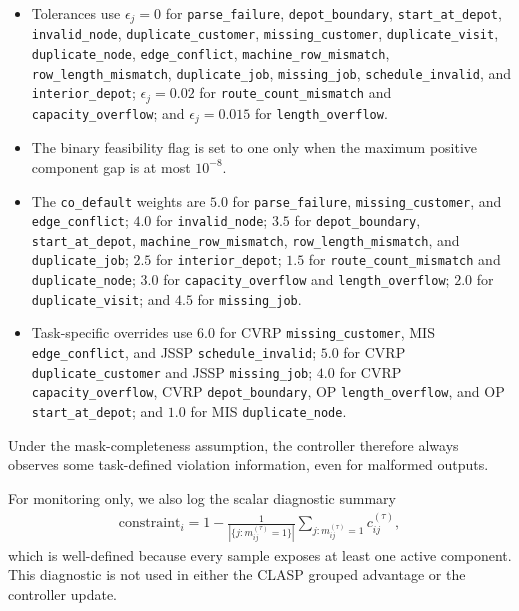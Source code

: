 \documentclass{article}
\theoremstyle{remark}
\begin{document}
\begin{sloppypar}
\begin{itemize}
\item Tolerances use \(\epsilon_j=0\) for \texttt{parse\_failure}, \texttt{depot\_boundary}, \texttt{start\_at\_depot}, \texttt{invalid\_node}, \texttt{duplicate\_customer}, \texttt{missing\_customer}, \texttt{duplicate\_visit}, \texttt{duplicate\_node}, \texttt{edge\_conflict}, \texttt{machine\_row\_mismatch}, \texttt{row\_length\_mismatch}, \texttt{duplicate\_job}, \texttt{missing\_job}, \texttt{schedule\_invalid}, and \texttt{interior\_depot}; \(\epsilon_j=0.02\) for \texttt{route\_count\_mismatch} and \texttt{capacity\_overflow}; and \(\epsilon_j=0.015\) for \texttt{length\_overflow}.
\item The binary feasibility flag is set to one only when the maximum positive component gap is at most \(10^{-8}\).
\item The \texttt{co\_default} weights are \(5.0\) for \texttt{parse\_failure}, \texttt{missing\_customer}, and \texttt{edge\_conflict}; \(4.0\) for \texttt{invalid\_node}; \(3.5\) for \texttt{depot\_boundary}, \texttt{start\_at\_depot}, \texttt{machine\_row\_mismatch}, \texttt{row\_length\_mismatch}, and \texttt{duplicate\_job}; \(2.5\) for \texttt{interior\_depot}; \(1.5\) for \texttt{route\_count\_mismatch} and \texttt{duplicate\_node}; \(3.0\) for \texttt{capacity\_overflow} and \texttt{length\_overflow}; \(2.0\) for \texttt{duplicate\_visit}; and \(4.5\) for \texttt{missing\_job}.
\item Task-specific overrides use \(6.0\) for CVRP \texttt{missing\_customer}, MIS \texttt{edge\_conflict}, and JSSP \texttt{schedule\_invalid}; \(5.0\) for CVRP \texttt{duplicate\_customer} and JSSP \texttt{missing\_job}; \(4.0\) for CVRP \texttt{capacity\_overflow}, CVRP \texttt{depot\_boundary}, OP \texttt{length\_overflow}, and OP \texttt{start\_at\_depot}; and \(1.0\) for MIS \texttt{duplicate\_node}.
\end{itemize}
\end{sloppypar}
Under the mask-completeness assumption, the controller therefore always observes some task-defined violation information, even for malformed outputs.

For monitoring only, we also log the scalar diagnostic summary
\begin{align}
\mathrm{constraint}_i = 1 - \frac{1}{|\{j:m_{ij}^{(\tau)}=1\}|}\sum_{j:m_{ij}^{(\tau)}=1} c_{ij}^{(\tau)},
\end{align}
which is well-defined because every sample exposes at least one active component. This diagnostic is not used in either the CLASP grouped advantage or the controller update.
\end{document}
